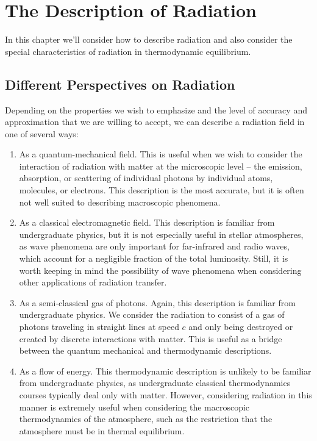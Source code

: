 \chapter{The Description of Radiation}
\label{chapter:description}

\noindent
In this chapter we'll consider how to describe radiation and also
consider the special characteristics of radiation in thermodynamic
equilibrium.

\newslide

\section{Different Perspectives on Radiation}

Depending on the properties we wish to emphasize and the level of
accuracy and approximation that we are willing to accept, we can
describe a radiation field in one of several ways:

\newslide

\begin{enumerate}

\item As a quantum-mechanical field. This is useful when we wish to
  consider the interaction of radiation with matter at the microscopic
  level -- the emission, absorption, or scattering of individual photons
  by individual atoms, molecules, or electrons. This description is the
  most accurate, but it is often not well suited to describing
  macroscopic phenomena.

\newslide

\item As a classical electromagnetic field. This description is familiar
  from undergraduate physics, but it is not especially useful in stellar
  atmospheres, as wave phenomena are only important for far-infrared and
  radio waves, which account for a negligible fraction of the total
  luminosity. Still, it is worth keeping in mind the possibility of wave
  phenomena when considering other applications of radiation transfer.

\newslide

\item As a semi-classical gas of photons. Again, this description is
  familiar from undergraduate physics. We consider the radiation to
  consist of a gas of photons traveling in straight lines at speed $c$
  and only being destroyed or created by discrete interactions with
  matter. This is useful as a bridge between the quantum mechanical and
  thermodynamic descriptions.

\newslide

\item As a flow of energy. This thermodynamic description is unlikely to
  be familiar from undergraduate physics, as undergraduate classical
  thermodynamics courses typically deal only with matter. However,
  considering radiation in this manner is extremely useful when
  considering the macroscopic thermodynamics of the atmosphere, such as
  the restriction that the atmosphere must be in thermal equilibrium.

\end{enumerate}

